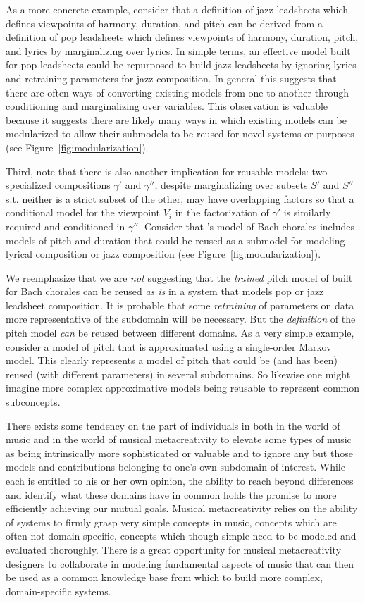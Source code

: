 \documentclass[letterpaper]{article}
\begin{document}
As a more concrete example, consider that a definition of jazz leadsheets which defines viewpoints of harmony, duration, and pitch can be derived from a definition of pop leadsheets which defines viewpoints of harmony, duration, pitch, and lyrics by marginalizing over lyrics. In simple terms, an effective model built for pop leadsheets could be repurposed to build jazz leadsheets by ignoring lyrics and retraining parameters for jazz composition. In general this suggests that there are often ways of converting existing models from one to another through conditioning and marginalizing over variables. This observation is valuable because it suggests there are likely many ways in which existing models can be modularized to allow their submodels to be reused for novel systems or purposes (see Figure~\ref{fig:modularization}).

Third, note that there is also another implication for reusable models: two specialized compositions $\gamma'$ and $\gamma''$, despite marginalizing over subsets $S'$ and $S''$ s.t. neither is a strict subset of the other, may have overlapping factors so that a conditional model for the viewpoint $V_i$ in the factorization of $\gamma'$ is similarly required and conditioned in $\gamma''$. Consider that \citeauthor{conklin1995multiple}'s model of Bach chorales includes models of pitch and duration that could be reused as a submodel for modeling lyrical composition or jazz composition (see Figure~\ref{fig:modularization}).

We reemphasize that we are \emph{not} suggesting that the \emph{trained} pitch model of \citeauthor{conklin1995multiple} built for Bach chorales can be reused \emph{as is} in a system that models pop or jazz leadsheet composition. It is probable that some \emph{retraining} of parameters on data more representative of the subdomain will be necessary. But the \emph{definition} of the pitch model \emph{can} be reused between different domains. As a very simple example, consider a model of pitch that is approximated using a single-order Markov model. This clearly represents a model of pitch that could be (and has been) reused (with different parameters) in several subdomains. So likewise one might imagine more complex approximative models being reusable to represent common subconcepts.

There exists some tendency on the part of individuals in both in the world of music and in the world of musical metacreativity to elevate some types of music as being intrinsically more sophisticated or valuable and to ignore any but those models and contributions belonging to one's own subdomain of interest. While each is entitled to his or her own opinion, the ability to reach beyond differences and identify what these domains have in common holds the promise to more efficiently achieving our mutual goals. Musical metacreativity relies on the ability of systems to firmly grasp very simple concepts in music, concepts which are often not domain-specific, concepts which though simple need to be modeled and evaluated thoroughly. There is a great opportunity for musical metacreativity designers to collaborate in modeling fundamental aspects of music that can then be used as a common knowledge base from which to build more complex, domain-specific systems. 
\end{document}
